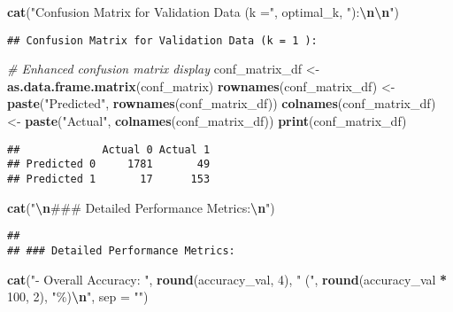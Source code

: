 \documentclass[
]{article}
\newenvironment{Shaded}{\begin{snugshade}}{\end{snugshade}}
\newcommand{\AttributeTok}[1]{\textcolor[rgb]{0.13,0.29,0.53}{#1}}
\newcommand{\CommentTok}[1]{\textcolor[rgb]{0.56,0.35,0.01}{\textit{#1}}}
\newcommand{\DecValTok}[1]{\textcolor[rgb]{0.00,0.00,0.81}{#1}}
\newcommand{\FunctionTok}[1]{\textcolor[rgb]{0.13,0.29,0.53}{\textbf{#1}}}
\newcommand{\NormalTok}[1]{#1}
\newcommand{\OtherTok}[1]{\textcolor[rgb]{0.56,0.35,0.01}{#1}}
\newcommand{\SpecialCharTok}[1]{\textcolor[rgb]{0.81,0.36,0.00}{\textbf{#1}}}
\newcommand{\StringTok}[1]{\textcolor[rgb]{0.31,0.60,0.02}{#1}}
\begin{document}
\begin{Shaded}
\begin{Highlighting}[]
\FunctionTok{cat}\NormalTok{(}\StringTok{"Confusion Matrix for Validation Data (k ="}\NormalTok{, optimal\_k, }\StringTok{"):}\SpecialCharTok{\textbackslash{}n\textbackslash{}n}\StringTok{"}\NormalTok{)}
\end{Highlighting}
\end{Shaded}

\begin{verbatim}
## Confusion Matrix for Validation Data (k = 1 ):
\end{verbatim}

\begin{Shaded}
\begin{Highlighting}[]
\CommentTok{\# Enhanced confusion matrix display}
\NormalTok{conf\_matrix\_df }\OtherTok{\textless{}{-}} \FunctionTok{as.data.frame.matrix}\NormalTok{(conf\_matrix)}
\FunctionTok{rownames}\NormalTok{(conf\_matrix\_df) }\OtherTok{\textless{}{-}} \FunctionTok{paste}\NormalTok{(}\StringTok{"Predicted"}\NormalTok{, }\FunctionTok{rownames}\NormalTok{(conf\_matrix\_df))}
\FunctionTok{colnames}\NormalTok{(conf\_matrix\_df) }\OtherTok{\textless{}{-}} \FunctionTok{paste}\NormalTok{(}\StringTok{"Actual"}\NormalTok{, }\FunctionTok{colnames}\NormalTok{(conf\_matrix\_df))}
\FunctionTok{print}\NormalTok{(conf\_matrix\_df)}
\end{Highlighting}
\end{Shaded}

\begin{verbatim}
##             Actual 0 Actual 1
## Predicted 0     1781       49
## Predicted 1       17      153
\end{verbatim}

\begin{Shaded}
\begin{Highlighting}[]
\FunctionTok{cat}\NormalTok{(}\StringTok{"}\SpecialCharTok{\textbackslash{}n}\StringTok{\#\#\# Detailed Performance Metrics:}\SpecialCharTok{\textbackslash{}n}\StringTok{"}\NormalTok{)}
\end{Highlighting}
\end{Shaded}

\begin{verbatim}
## 
## ### Detailed Performance Metrics:
\end{verbatim}

\begin{Shaded}
\begin{Highlighting}[]
\FunctionTok{cat}\NormalTok{(}\StringTok{"{-} Overall Accuracy: "}\NormalTok{, }\FunctionTok{round}\NormalTok{(accuracy\_val, }\DecValTok{4}\NormalTok{), }\StringTok{" ("}\NormalTok{, }\FunctionTok{round}\NormalTok{(accuracy\_val }\SpecialCharTok{*} \DecValTok{100}\NormalTok{, }\DecValTok{2}\NormalTok{), }\StringTok{"\%)}\SpecialCharTok{\textbackslash{}n}\StringTok{"}\NormalTok{, }\AttributeTok{sep =} \StringTok{""}\NormalTok{)}
\end{Highlighting}
\end{Shaded}
\end{document}
